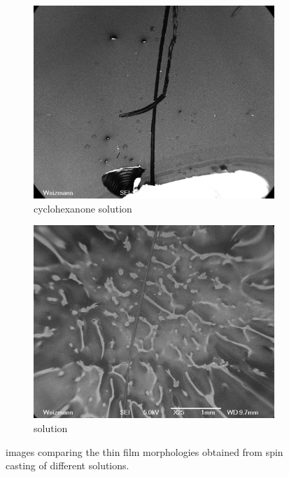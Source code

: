 \begin{figure}
\begin{subfigure}{1\textwidth}
\centering
	\includegraphics[width=0.9\linewidth]{./figs/chap1/semCYCLO}
	\caption{cyclohexanone solution}
	\label{fig:semCYCLO}
\end{subfigure}
\vspace{30pt}
\begin{subfigure}{1\textwidth}
\centering
	\includegraphics[width=0.9\linewidth]{./figs/chap1/semDMF}
	\caption{\dmf{} solution}
	\label{fig:semDMF}
\end{subfigure}
\caption{\sem{} images comparing the \pvdf{} thin film morphologies obtained from spin casting of different solutions.}
\label{fig:semsolvent}
\end{figure}
